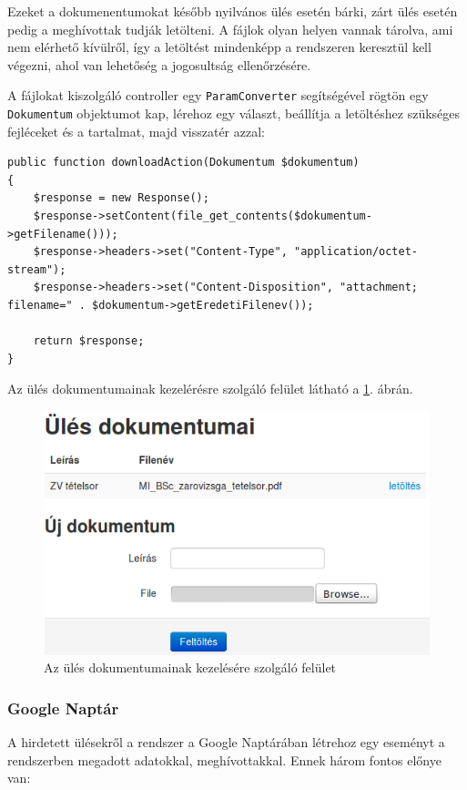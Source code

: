 \documentclass[a4paper,12pt,oneside]{report}
\begin{document}
Ezeket a dokumenentumokat később nyilvános ülés esetén bárki, zárt ülés esetén pedig a meghívottak tudják letölteni. A fájlok olyan helyen vannak tárolva, ami nem elérhető kívülről, így a letöltést mindenképp a rendszeren keresztül kell végezni, ahol van lehetőség a jogosultság ellenőrzésére.

A fájlokat kiszolgáló controller egy {\tt ParamConverter} segítségével rögtön egy {\tt Dokumentum} objektumot kap, lérehoz egy választ, beállítja a letöltéshez szükséges fejléceket és a tartalmat, majd visszatér azzal:

\begin{lstlisting}
public function downloadAction(Dokumentum $dokumentum)
{
    $response = new Response();
    $response->setContent(file_get_contents($dokumentum->getFilename()));
    $response->headers->set("Content-Type", "application/octet-stream");
    $response->headers->set("Content-Disposition", "attachment; filename=" . $dokumentum->getEredetiFilenev());

    return $response;
}
\end{lstlisting}

Az ülés dokumentumainak kezelérésre szolgáló felület látható a \ref{fig:ules_dokumentumok}. ábrán.

\begin{figure}[h]
    \centering
    \includegraphics[width=.8\textwidth]{ules_dokumentumok.png}
    \caption{Az ülés dokumentumainak kezelésére szolgáló felület}
    \label{fig:ules_dokumentumok}
\end{figure}

\subsubsection*{Google Naptár}

A hirdetett ülésekről a rendszer a Google Naptárában létrehoz egy eseményt a rendszerben megadott adatokkal, meghívottakkal. Ennek három fontos előnye van:
\end{document}
